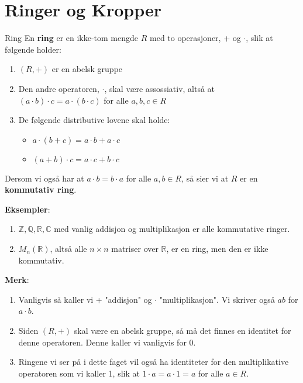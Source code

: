 \section{Ringer og Kropper}

\begin{definition}{Ring}{}
  En \textbf{ring} er en ikke-tom mengde $R$ med to operasjoner, + og $\cdot$, slik at følgende
  holder:
  \begin{enumerate}[label=$\mathscr{R}$\arabic*)]
    \item $(R, +)$ er en abelsk gruppe
    \item Den andre operatoren, $\cdot$, skal være assossiativ, altså at 
      $(a\cdot b)\cdot c = a\cdot (b\cdot c)$ for alle $a,b,c\in R$
    \item De følgende distributive lovene skal holde:
      \begin{itemize}
        \item $a\cdot (b+c) = a\cdot b + a\cdot c$
        \item $(a + b)\cdot c = a\cdot c + b\cdot c$
      \end{itemize}
  \end{enumerate}
  Dersom vi også har at $a\cdot b = b \cdot a$ for alle $a, b\in R$, så sier vi at $R$ er en
  \textbf{kommutativ ring}.
\end{definition}

\textbf{Eksempler}:
\begin{enumerate}
  \item $\mathbb{Z}, \mathbb{Q}, \mathbb{R}, \mathbb{C}$ med vanlig addisjon og multiplikasjon
    er alle kommutative ringer.
  \item $M_n(\mathbb{R})$, altså alle $n\times n$ matriser over $\mathbb{R}$, er en ring, men 
    den er ikke kommutativ.
\end{enumerate}

\textbf{Merk}:
\begin{enumerate}
  \item Vanligvis så kaller vi + "addisjon" og $\cdot$ "multiplikasjon". Vi skriver også 
    $ab$ for $a\cdot b$.
  \item Siden $(R, +)$ skal være en abelsk gruppe, så må det finnes en identitet for denne
    operatoren. Denne kaller vi vanligvis for 0. 
  \item Ringene vi ser på i dette faget vil også ha identiteter for den multiplikative operatoren
    som vi kaller 1, slik at $1\cdot a = a\cdot 1 = a$ for alle $a \in R$. 
\end{enumerate}

